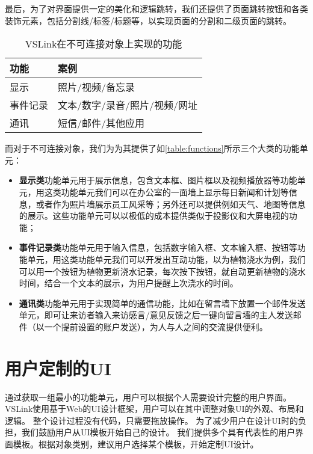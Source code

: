 最后，为了对界面提供一定的美化和逻辑跳转，我们还提供了页面跳转按钮和各类装饰元素，包括分割线/标签/标题等，以实现页面的分割和二级页面的跳转。

\begin{table}[htb]
	\caption{VSLink在不可连接对象上实现的功能}  \label{table:functions}  
	\begin{center}  
		\begin{tabular}{|l|l|}  
			\hline  
			\textbf{功能} & \textbf{案例} \\ \hline  
			显示 & 照片/视频/备忘录   \\ \hline 
			事件记录 & 文本/数字/录音/照片/视频/网址   \\ \hline 
			通讯 & 短信/邮件/其他应用   \\ \hline  
		\end{tabular}  
	\end{center}  
\end{table}

而对于不可连接对象，我们为为其提供了如\autoref{table:functions}所示三个大类的功能单元：

\begin{itemize}
	\item \textbf{显示类}功能单元用于展示信息，包含文本框、图片框以及视频播放器等功能单元，用这类功能单元我们可以在办公室的一面墙上显示每日新闻和计划等信息，或者作为照片墙展示员工风采等；另外还可以提供例如天气、地图等信息的展示。这些功能单元可以以极低的成本提供类似于投影仪和大屏电视的功能；
	\item \textbf{事件记录类}功能单元用于输入信息，包括数字输入框、文本输入框、按钮等功能单元，用这类功能单元我们可以开发出互动功能，以为植物浇水为例，我们可以用一个按钮为植物更新浇水记录，每次按下按钮，就自动更新植物的浇水时间，结合一个文本的展示，为用户提醒上次浇水的时间。
	\item \textbf{通讯类}功能单元用于实现简单的通信功能，比如在留言墙下放置一个邮件发送单元，即可让来访者输入来访感言/意见反馈之后一键向留言墙的主人发送邮件（以一个提前设置的账户发送），为人与人之间的交流提供便利。
\end{itemize}


 
\section{用户定制的UI}
通过获取一组最小的功能单元，用户可以根据个人需要设计完整的用户界面。
VSLink使用基于Web的UI设计框架，用户可以在其中调整对象UI的外观、布局和逻辑。
整个设计过程没有代码，只需要拖放操作。
为了减少用户在设计UI时的负担，我们鼓励用户从UI模板开始自己的设计。
我们提供多个具有代表性的用户界面模板。根据对象类别，建议用户选择某个模板，开始定制UI设计。

